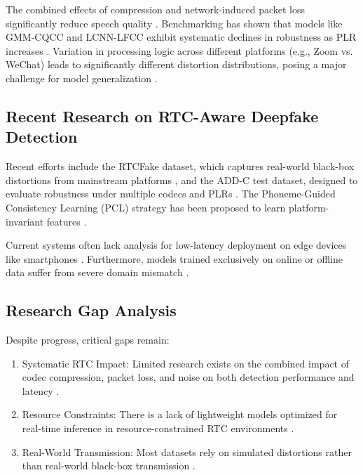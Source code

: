 The combined effects of compression and network-induced packet loss significantly reduce speech quality \cite{Shi2024}. Benchmarking has shown that models like GMM-CQCC and LCNN-LFCC exhibit systematic declines in robustness as PLR increases \cite{Shi2024}. Variation in processing logic across different platforms (e.g., Zoom vs. WeChat) leads to significantly different distortion distributions, posing a major challenge for model generalization \cite{Xue2025_RTCFake}.

\subsection{Recent Research on RTC-Aware Deepfake Detection}

Recent efforts include the RTCFake dataset, which captures real-world black-box distortions from mainstream platforms \cite{Xue2025_RTCFake}, and the ADD-C test dataset, designed to evaluate robustness under multiple codecs and PLRs \cite{Shi2024}. The Phoneme-Guided Consistency Learning (PCL) strategy has been proposed to learn platform-invariant features \cite{Xue2025_RTCFake}.

Current systems often lack analysis for low-latency deployment on edge devices like smartphones \cite{Pham2024}. Furthermore, models trained exclusively on online or offline data suffer from severe domain mismatch \cite{Xue2025_RTCFake, Mathew2024}.

\subsection{Research Gap Analysis}

Despite progress, critical gaps remain:
\vspace{-0.5cm}
\begin{enumerate}
\item Systematic RTC Impact: Limited research exists on the combined impact of codec compression, packet loss, and noise on both detection performance and latency \cite{Shi2024, Pham2024}.
\item Resource Constraints: There is a lack of lightweight models optimized for real-time inference in resource-constrained RTC environments \cite{Pham2024, Bird2023}.
\item Real-World Transmission: Most datasets rely on simulated distortions rather than real-world black-box transmission \cite{Xue2025_RTCFake}.
\end{enumerate}


